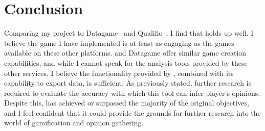 \chapter{Conclusion}
Comparing my project to Datagame~\cite{Datagame} and Qualifio~\cite{Qualifio}, I find that \od{} holds up well. 
I believe the game I have implemented is at least as engaging as the games available on these other platforms. 
\od{} and Datagame offer similar game creation capabilities, and while I cannot speak for the analysis tools provided by these other services, I believe the functionality provided by \od{}, combined with its capability to export data, is sufficient. 
As previously stated, further research is required to evaluate the accuracy with which this tool can infer player's opinions. 
Despite this, \od{} has achieved or surpassed the majority of the original objectives, and I feel confident that it could provide the grounds for further research into the world of gamification and opinion gathering.
